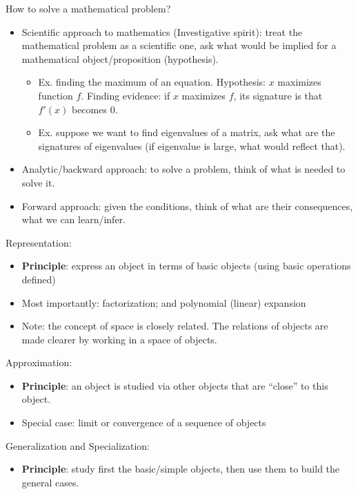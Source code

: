 \documentclass{report}
\begin{document}
How to solve a mathematical problem? 
\begin{itemize}
	\item Scientific approach to mathematics (Investigative spirit): treat the mathematical problem as a scientific one, ask what would be implied for a mathematical object/proposition (hypothesis).
	\begin{itemize}
		\item Ex. finding the maximum of an equation. Hypothesis: $x$ maximizes function $f$. Finding evidence: if $x$ maximizes $f$, its signature is that $f'(x)$ becomes 0. 
		
		\item Ex. suppose we want to find eigenvalues of a matrix, ask what are the signatures of eigenvalues (if eigenvalue is large, what would reflect that). 
	\end{itemize} 
	
	\item Analytic/backward approach: to solve a problem, think of what is needed to solve it. 
		
	\item Forward approach: given the conditions, think of what are their consequences, what we can learn/infer. 
\end{itemize} 

Representation:
\begin{itemize}
	\item \textbf{Principle}: express an object in terms of basic objects (using basic operations defined)
	
	\item Most importantly: factorization; and polynomial (linear) expansion
	
	\item Note: the concept of space is closely related. The relations of objects are made clearer by working in a space of objects. 
\end{itemize}

Approximation:
\begin{itemize}
	\item \textbf{Principle}: an object is studied via other objects that are ``close'' to this object. 
	
	\item Special case: limit or convergence of a sequence of objects
\end{itemize}

Generalization and Specialization:
\begin{itemize}
	\item \textbf{Principle}: study first the basic/simple objects, then use them to build the general cases.
\end{itemize}
 
\end{document}
